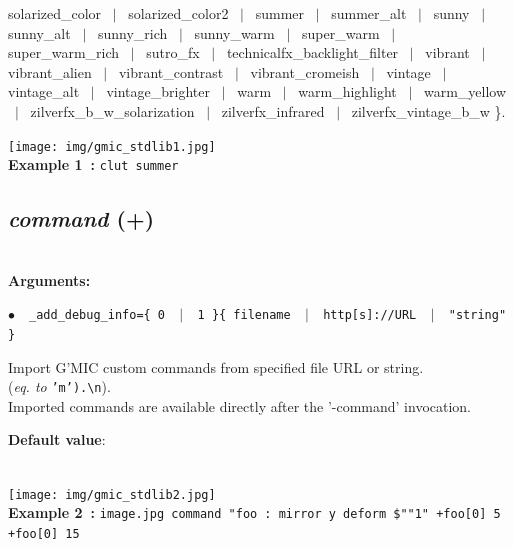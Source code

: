 \documentclass[a4paper,10.5pt,twoside]{book}
\def\comma{\discretionary{,}{}{,}}
\newcommand{\Cb}[1]{\textcolor{cb}{#1}}
\newcommand{\Cc}[1]{\textcolor{cc}{#1}}
\begin{document}
solarized\_color ~$|$~ solarized\_color2 ~$|$~ summer ~$|$~ summer\_alt ~$|$~ sunny ~$|$~ sunny\_alt ~$|$~ sunny\_rich ~$|$~ sunny\_warm ~$|$~ super\_warm ~$|$~ super\_warm\_rich ~$|$~ sutro\_fx ~$|$~ technicalfx\_backlight\_filter ~$|$~ vibrant ~$|$~ vibrant\_alien ~$|$~ vibrant\_contrast ~$|$~ vibrant\_cromeish ~$|$~ vintage ~$|$~ vintage\_alt ~$|$~ vintage\_brighter ~$|$~ warm ~$|$~ warm\_highlight ~$|$~ warm\_yellow ~$|$~ zilverfx\_b\_w\_solarization ~$|$~ zilverfx\_infrared ~$|$~ zilverfx\_vintage\_b\_w \}.
\begin{center}\texttt{[image: img/gmic\_stdlib1.jpg]}\\
{\footnotesize \textbf{Example 1~:} \texttt{clut summer}}
\end{center}

\subsection{\emph{command} (+)}\vspace*{-0.7em}
~\\\textbf{\Cb{Arguments: }}\begin{flushleft}
{\small \Cb{\hspace*{0.5cm}$\bullet$~~\texttt{\_add\_debug\_info=\{ 0 ~$|$~ 1 \}{\comma}\{ filename ~$|$~ http[s]://URL ~$|$~ "stri\-ng" \}}}}\end{flushleft}
Import G'MIC custom commands from specified file{\comma} URL or string.
~\\(\emph{eq. to} {\small \texttt{'m').\textbackslash n}}).
~\\Imported commands are available directly after the '-command' invocation.
\begin{flushleft}\Cc{\textbf{Default value}:\\~\\\hspace*{0.5cm}{\small $\bullet$~~\texttt{'add\_debug\_info=1'.}}}\end{flushleft}
\begin{center}\texttt{[image: img/gmic\_stdlib2.jpg]}\\
{\footnotesize \textbf{Example 2~:} \texttt{image.jpg command "foo : mirror y deform \$""1" +foo[0] 5 +foo[0] 15}}
\end{center}
\end{document}
